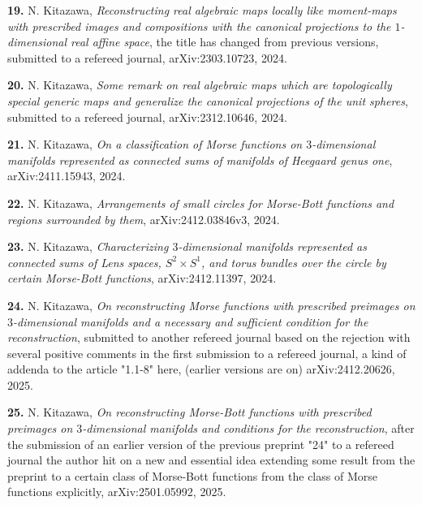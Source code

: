 \documentclass{article}
\begin{document}
\par\noindent
{\bf 19.} N. Kitazawa, \textsl{Reconstructing real algebraic maps locally like moment-maps with prescribed images and compositions with the canonical projections to the $1$-dimensional real affine space}, the title has changed from previous versions, submitted to a refereed journal, arXiv:2303.10723, 2024.

\par\noindent
{\bf 20.} N. Kitazawa, \textsl{Some remark on real algebraic maps which are topologically special generic maps and generalize the canonical projections of the unit spheres}, submitted to a refereed journal, arXiv:2312.10646, 2024.

\par\noindent
{\bf 21.} N. Kitazawa, \textsl{On a classification of Morse functions on $3$-dimensional manifolds represented as connected sums of manifolds of Heegaard genus one}, arXiv:2411.15943, 2024.

\par\noindent
{\bf 22.} N. Kitazawa, \textsl{Arrangements of small circles for Morse-Bott functions and regions surrounded by them}, arXiv:2412.03846v3, 2024.

\par\noindent
{\bf 23.} N. Kitazawa, \textsl{Characterizing $3$-dimensional manifolds represented as connected sums of Lens spaces, $S^2 \times S^1$, and torus bundles over the circle by certain Morse-Bott functions}, arXiv:2412.11397, 2024.

\par\noindent
{\bf 24.} N. Kitazawa, \textsl{On reconstructing Morse functions with prescribed preimages on $3$-dimensional manifolds and a necessary and sufficient condition for the reconstruction}, submitted to another refereed journal based on the rejection with several positive
comments in the first submission to a refereed journal, a kind of addenda to the article "1.1-8" here, (earlier versions are on)
arXiv:2412.20626, 2025.

\par\noindent
{\bf 25.} N. Kitazawa, \textsl{On reconstructing Morse-Bott functions with prescribed preimages on $3$-dimensional manifolds and conditions for the reconstruction}, after the submission of an earlier version of the previous preprint "24" to a refereed journal the author hit on a new and essential idea extending some result from the preprint to a certain class of Morse-Bott functions from the class of Morse functions explicitly, arXiv:2501.05992, 2025.
\end{document}
